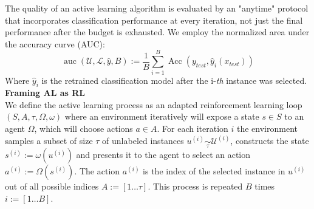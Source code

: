 \documentclass[]{article}
\begin{document}
The quality of an active learning algorithm is evaluated by an "anytime" protocol that incorporates classification performance at every iteration, not just the final performance after the budget is exhausted.
We employ the normalized area under the accuracy curve (AUC):
\begin{equation}\label{eq:auc}
	\operatorname{auc}(\mathcal{U}, \mathcal{L}, \hat y, B) := \frac{1}{B} \sum_{i=1}^{B} \operatorname{Acc}(y_{test}, \hat y_i(x_{test}))
\end{equation}
Where $\hat y_i$ is the retrained classification model after the i-\textit{th} instance was selected. \\ [1mm]
%
\textbf{Framing AL as RL}\\
We define the active learning process as an adapted reinforcement learning loop $(S, A, \tau, \Omega, \omega)$ where an environment iteratively will expose a state $s \in S$ to an agent $\Omega$, which will choose actions $a \in A$.
For each iteration $i$ the environment samples a subset of size $\tau$ of unlabeled instances $u^{(i)} \underset{\tau}{\sim} \mathcal{U}^{(i)}$, constructs the state $s^{(i)} := \omega(u^{(i)})$ and presents it to the agent to select an action $a^{(i)} := \Omega(s^{(i)})$.
The action $a^{(i)}$ is the index of the selected instance in $u^{(i)}$ out of all possible indices $A := [1 \ldots \tau]$.
This process is repeated $B$ times $i := [1 \ldots B]$.
\end{document}
